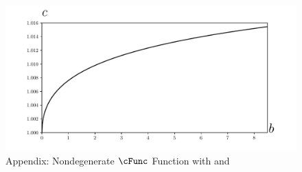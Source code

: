 \hypertarget{PFGICHoldsFHWCFailsRICFails}{}
\begin{figure}
\centerline{\includegraphics[width=6in]{Figures/PFGICHoldsFHWCFailsRICFails}}
\caption{Appendix: Nondegenerate $\cFunc$ Function with  and }
\label{fig:PFGICHoldsFHWCFailsRICFails}
\end{figure}
